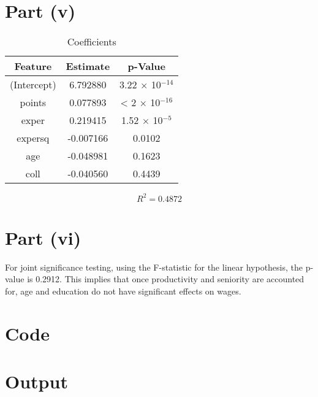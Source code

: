 \documentclass{./solution}
\begin{document}
\begin{solution}[Wooldridge C6.9]
        \section*{Part (v)}
            \begin{table}[H]
                \caption{Coefficients}
                \begin{tabularx}{\textwidth}{C C C}
                    \toprule
                    Feature & Estimate & p-Value \\
                    \midrule
                    (Intercept) &  6.792880 &  3.22 $\times$ 10$^{-14}$ \\
                    points      &  0.077893 &   < 2 $\times$ 10$^{-16}$ \\
                    exper       &  0.219415 &  1.52 $\times$ 10$^{-5}$ \\
                    expersq     & -0.007166 &    0.0102 \\
                    age         & -0.048981 &    0.1623 \\
                    coll        & -0.040560 &    0.4439 \\
                    \bottomrule
                \end{tabularx}
            \end{table}
            \vspace{-5mm}
            $$ R^2 = 0.4872 $$

        \section*{Part (vi)}
            For joint significance testing, using the F-statistic for the linear hypothesis, the p-value is 0.2912.
            This implies that once productivity and seniority are accounted for, age and education do not have significant effects on wages.

        \section*{Code}

        \section*{Output}
    \end{solution}
\end{document}
